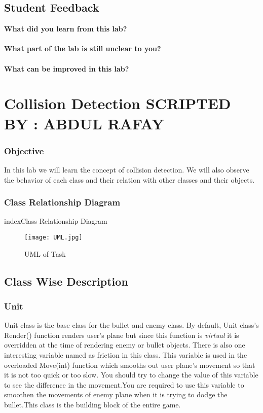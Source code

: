\documentclass[11pt,fleqn]{book} %
\begin{document}
\newpage
\section{Student Feedback}
\textbf{What did you learn from this lab?}\\
\noindent\fbox{\parbox{\textwidth}{
  }
}\\
\textbf{What part of the lab is still unclear to you?}\\
\noindent\fbox{\parbox{\textwidth}{
  }
}\\
\textbf{What can be improved in this lab?}\\ 
\noindent\fbox{\parbox{\textwidth}{
  }
}

\newpage
{} %

\chapter{Collision Detection \hspace{38mm} {\textsc{\small SCRIPTED BY : ABDUL RAFAY}}}
\subsection{Objective}
In this lab we will learn the concept of collision detection. We will also observe the behavior of each class and their relation with other classes and their objects.
\subsection{Class Relationship Diagram}index{Class Relationship Diagram}
\begin{figure}[h]
  \centering\texttt{[image: UML.jpg]}
  \caption{UML of Task}
\end{figure}
\newpage
\section{Class Wise Description}
\subsection{Unit}
Unit class is the base class for the bullet and enemy class. By default, Unit class's Render() function renders user's plane but since this function is \emph{virtual} it is overridden at the time of rendering enemy or bullet objects. There is also one interesting variable named as friction in this class. This variable is used in the overloaded Move(int) function which smooths out user plane's movement so that it is not too quick or too slow. You should try to change the value of this variable to see the difference in the movement.You are required to use this variable to smoothen the movements of enemy plane when it is trying to dodge the bullet.This class is the building block of the entire game.
\end{document}
